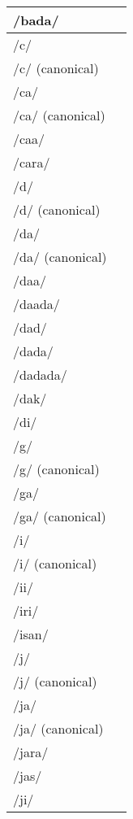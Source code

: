 \documentclass{article}
\begin{document}
\begin{longtable}{|l|p{}|}
/bada/ & \textIndus{} \\ \hline
/c/ & \textIndus{} \\ \hline
/c/ (canonical) & \textIndus{} \\ \hline
/ca/ & \textIndus{} \\ \hline
/ca/ (canonical) & \textIndus{} \\ \hline
/caa/ & \textIndus{} \\ \hline
/cara/ & \textIndus{} \\ \hline
/d/ & \textIndus{} \\ \hline
/d/ (canonical) & \textIndus{} \\ \hline
/da/ & \textIndus{} \\ \hline
/da/ (canonical) & \textIndus{} \\ \hline
/daa/ & \textIndus{} \\ \hline
/daada/ & \textIndus{} \\ \hline
/dad/ & \textIndus{} \\ \hline
/dada/ & \textIndus{} \\ \hline
/dadada/ & \textIndus{} \\ \hline
/dak/ & \textIndus{} \\ \hline
/di/ & \textIndus{} \\ \hline
/g/ & \textIndus{} \\ \hline
/g/ (canonical) & \textIndus{} \\ \hline
/ga/ & \textIndus{} \\ \hline
/ga/ (canonical) & \textIndus{} \\ \hline
/i/ & \textIndus{} \\ \hline
/i/ (canonical) & \textIndus{} \\ \hline
/ii/ & \textIndus{} \\ \hline
/iri/ & \textIndus{} \\ \hline
/isan/ & \textIndus{} \\ \hline
/j/ & \textIndus{} \\ \hline
/j/ (canonical) & \textIndus{} \\ \hline
/ja/ & \textIndus{} \\ \hline
/ja/ (canonical) & \textIndus{} \\ \hline
/jara/ & \textIndus{} \\ \hline
/jas/ & \textIndus{} \\ \hline
/ji/ & \textIndus{} \\ \hline

\end{longtable}
\end{document}
